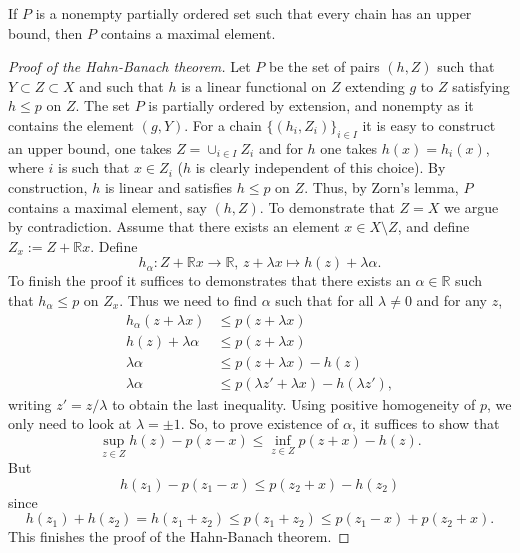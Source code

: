 \begin{theorem*}
  If $P$ is a nonempty partially ordered set such that every chain has an upper bound,
  then $P$ contains a maximal element.
\end{theorem*}

\begin{proof}[Proof of the Hahn-Banach theorem]
  Let $P$ be the set of pairs $(h,Z)$ such that $Y\subset Z\subset X$
  and such that $h$ is a linear functional on $Z$ extending $g$ to $Z$ satisfying $h\leq p$ on $Z$.
  The set $P$ is partially ordered by extension, and nonempty as it contains
  the element $(g,Y)$.
  For a chain $\{(h_i,Z_i)\}_{i\in I}$ it is easy to construct an upper bound,
  one takes $Z=\cup_{i\in I}Z_i$ and for $h$ one takes
  $h(x)=h_i(x)$, where $i$ is such that $x\in Z_i$ ($h$ is clearly independent of this choice).
  By construction, $h$ is linear and satisfies $h\leq p$ on $Z$.
  Thus, by Zorn's lemma, $P$ contains a maximal element, say $(h,Z)$.
  To demonstrate that $Z=X$ we argue by contradiction.
  Assume that there exists an element $x\in X\setminus Z$, and define $Z_x:=Z+\mathbb{R}x$.
  Define $$h_\alpha:Z+\mathbb{R}x\to\mathbb{R},\,z+\lambda x\mapsto h(z)+\lambda\alpha.$$
  To finish the proof it suffices to demonstrates that there exists an $\alpha\in\mathbb{R}$
  such that $h_\alpha\leq p$ on $Z_x$.
  Thus we need to find $\alpha$ such that for all $\lambda\neq0$ and for any $z$,
  \begin{align*}
    h_\alpha(z+\lambda x)&\leq  p(z+\lambda x)\\
    h(z)+\lambda\alpha&\leq p(z+\lambda x)\\
    \lambda\alpha&\leq p(z+\lambda x)-h(z)\\
    \lambda\alpha&\leq p(\lambda z'+\lambda x)-h(\lambda z'),
  \end{align*}
  writing $z'=z/\lambda$ to obtain the last inequality.
  Using positive homogeneity of $p$, we only need to look at $\lambda=\pm 1$.
  So, to prove existence of $\alpha$, it suffices to show that
  $$\sup_{z\in Z} h(z)-p(z-x) \leq \inf_{z\in Z} p(z+x)-h(z).$$
  But
  $$h(z_1)-p(z_1-x)\leq p(z_2+x)-h(z_2)$$
  since
  $$h(z_1)+h(z_2)=h(z_1+z_2)\leq p(z_1+z_2)\leq p(z_1-x)+p(z_2+x).$$
  This finishes the proof of the Hahn-Banach theorem.
\end{proof}
